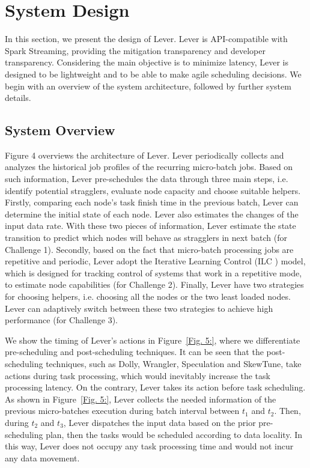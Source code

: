 \section{System Design}

In this section, we present the design of Lever. Lever is 
API-compatible with Spark Streaming, providing the mitigation transparency and
developer transparency. Considering the main objective is to minimize latency,
Lever is designed to be lightweight and to be able to make agile scheduling
decisions. We begin with an overview of the system architecture, followed by
further system details.

\subsection{System Overview}

Figure 4 overviews the architecture of Lever. Lever periodically collects and
analyzes the historical job profiles of the recurring micro-batch jobs.
Based on such information, Lever pre-schedules the data through three main
steps, i.e. identify potential stragglers, evaluate node capacity and choose
suitable helpers. Firstly, comparing each node's task finish time in the previous
batch, Lever can determine the initial state of each node. Lever also
estimates the changes of the input data rate. With these two pieces of
information, Lever estimate the state transition to predict which nodes will
behave as stragglers in next batch (for Challenge 1). Secondly, based on the fact that
micro-batch processing jobs are repetitive and periodic, Lever adopt the
Iterative Learning Control (ILC \cite{Arimoto}) model, which is designed for
tracking control of systems that work in a repetitive mode, to estimate
node capabilities (for Challenge 2). Finally, 
Lever have two strategies for choosing helpers, i.e. choosing all the nodes or
the two least loaded nodes. Lever can adaptively switch between these two
strategies to achieve high performance (for Challenge 3).

We show the timing of Lever's actions in Figure~\ref{Fig. 5:}, where we differentiate
pre-scheduling and post-scheduling techniques. It can
be seen that the post-scheduling techniques, such as Dolly, Wrangler, Speculation and SkewTune, take actions
during task processing, which would inevitably increase the task processing
latency. On the contrary,  Lever takes its action before task scheduling. As
shown in Figure~\ref{Fig. 5:}, Lever collects the needed information of the
previous micro-batches execution during batch interval between $t_1$ and $t_2$.
Then, during $t_2$ and $t_3$, Lever dispatches the input data based on the prior
pre-scheduling plan, then the tasks would be scheduled according to data
locality. In this way, Lever does not occupy any task processing time and would
not incur any data movement.  

